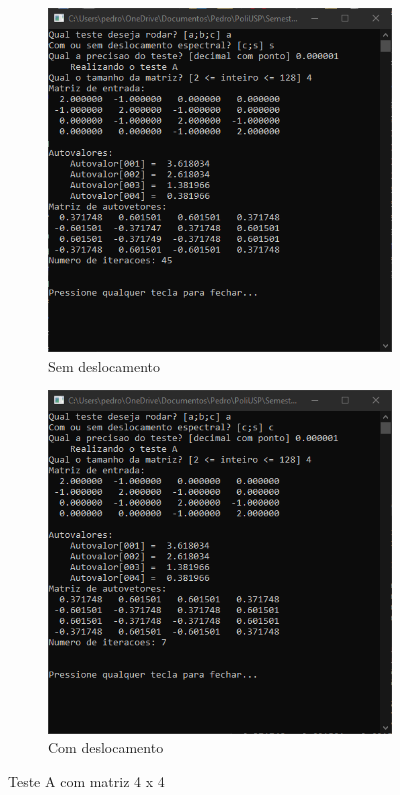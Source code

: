 \documentclass[12pt]{article} %
\begin{document}
        \begin{figure}[h]
            \centering
            \begin{subfigure}{0.475\linewidth}
                \includegraphics[width=\linewidth]{A4s.png} 
                \caption{Sem deslocamento}
                \label{fig:subA4s}
            \end{subfigure}
            \begin{subfigure}{0.475\linewidth}
                \includegraphics[width=\linewidth]{A4c.png}
                \caption{Com deslocamento}
                \label{fig:subA4c}
            \end{subfigure}
            \caption{Teste A com matriz 4 x 4}
            \label{fig:A4}
        \end{figure}
        
\end{document}
